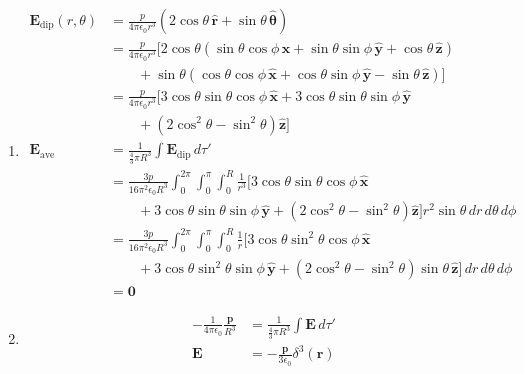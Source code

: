 \documentclass{article}
\renewcommand{\vec}[1]{\boldsymbol{\mathbf{#1}}}
\newcommand{\uvec}[1]{\hat{\vec{#1}}}
\newcommand{\ke}{\frac{1}{4 \pi \epsilon_0}}
\begin{document}
\begin{enumerate}
  \item

        \begin{align*}
          \vec{E}_\text{dip}(r, \theta) & = \frac{p}{4 \pi \epsilon_0 r^3} (2 \cos \theta \,\uvec{r} + \sin \theta \,\uvec{\theta})                                                       \\
                                        & = \frac{p}{4 \pi \epsilon_0 r^3} [2 \cos \theta (\sin \theta \cos \phi \,\uvec{x} + \sin \theta \sin \phi \,\uvec{y} + \cos \theta \,\uvec{z})  \\
                                        & \qquad + \sin \theta (\cos \theta \cos \phi \,\uvec{x} + \cos \theta \sin \phi \,\uvec{y} - \sin \theta \,\uvec{z})]                            \\
                                        & = \frac{p}{4 \pi \epsilon_0 r^3} [3 \cos \theta \sin \theta \cos \phi \,\uvec{x} + 3 \cos \theta \sin \theta \sin \phi \,\uvec{y}               \\
                                        & \qquad + (2 \cos^2 \theta - \sin^2 \theta) \uvec{z}]                                                                                            \\
          \vec{E}_\text{ave}            & = \frac{1}{\frac{4}{3} \pi R^3} \int \vec{E}_\text{dip} \,d \tau'                                                                               \\
                                        & = \frac{3 p}{16 \pi^2 \epsilon_0 R^3} \int_0^{2 \pi} \int_0^\pi \int_0^R \frac{1}{r^3} [3 \cos \theta \sin \theta \cos \phi \,\uvec{x}          \\
                                        & \qquad + 3 \cos \theta \sin \theta \sin \phi \,\uvec{y} + (2 \cos^2 \theta - \sin^2 \theta) \uvec{z}] r^2 \sin \theta \,d r \,d \theta \,d \phi \\
                                        & = \frac{3 p}{16 \pi^2 \epsilon_0 R^3} \int_0^{2 \pi} \int_0^\pi \int_0^R \frac{1}{r} [3 \cos \theta \sin^2 \theta \cos \phi \,\uvec{x}          \\
                                        & \qquad + 3 \cos \theta \sin^2 \theta \sin \phi \,\uvec{y} + (2 \cos^2 \theta - \sin^2 \theta) \sin \theta \,\uvec{z}] \,d r \,d \theta \,d \phi \\
                                        & = \vec{0}
        \end{align*}

  \item

        \begin{align*}
          -\ke \frac{\vec{p}}{R^3} & = \frac{1}{\frac{4}{3} \pi R^3} \int \vec{E} \,d \tau' \\
          \vec{E}                  & = -\frac{\vec{p}}{3 \epsilon_0} \delta^3(\vec{r})
        \end{align*}
\end{enumerate}
\end{document}
